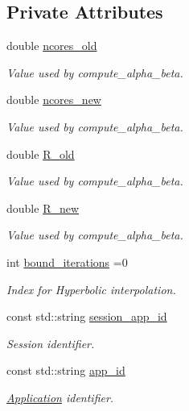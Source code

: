 \subsection*{Private Attributes}
\begin{DoxyCompactItemize}
\item 
double \hyperlink{classApplication_a704e411528bc630525070e8b3e990145}{ncores\-\_\-old}
\begin{DoxyCompactList}\small\item\em Value used by compute\-\_\-alpha\-\_\-beta. \end{DoxyCompactList}\item 
double \hyperlink{classApplication_a12d69161b8f2767e6ea1d19d3e6457e2}{ncores\-\_\-new}
\begin{DoxyCompactList}\small\item\em Value used by compute\-\_\-alpha\-\_\-beta. \end{DoxyCompactList}\item 
double \hyperlink{classApplication_a950cfc8da4a8e4640aee8d2840f53e0e}{R\-\_\-old}
\begin{DoxyCompactList}\small\item\em Value used by compute\-\_\-alpha\-\_\-beta. \end{DoxyCompactList}\item 
double \hyperlink{classApplication_a9e94824741ac0c52d0fa5ede30c72fa1}{R\-\_\-new}
\begin{DoxyCompactList}\small\item\em Value used by compute\-\_\-alpha\-\_\-beta. \end{DoxyCompactList}\item 
int \hyperlink{classApplication_aa8ce75259c9f7e5a80bad43ff963a2a8}{bound\-\_\-iterations} =0
\begin{DoxyCompactList}\small\item\em Index for Hyperbolic interpolation. \end{DoxyCompactList}\item 
const std\-::string \hyperlink{classApplication_a6152c40564d526b9b60871c98f7a51c7}{session\-\_\-app\-\_\-id}
\begin{DoxyCompactList}\small\item\em Session identifier. \end{DoxyCompactList}\item 
const std\-::string \hyperlink{classApplication_a5cedee59cfd3cbf89d02174e2f521493}{app\-\_\-id}
\begin{DoxyCompactList}\small\item\em \hyperlink{classApplication}{Application} identifier. \end{DoxyCompactList}\item 

\end{DoxyCompactItemize}
